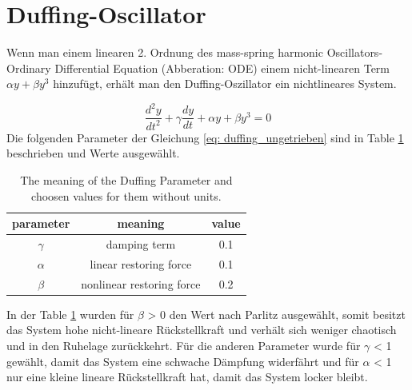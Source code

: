 \documentclass[oneside,10pt,a4paper]{report}
\begin{document}
		\section{Duffing-Oscillator}
		Wenn man einem linearen 2. Ordnung des mass-spring harmonic Oscillators-Ordinary Differential Equation (Abberation: ODE) einem nicht-linearen Term $\alpha y +\beta y^3$ hinzufügt, erhält man den Duffing-Oszillator\cite{twist_paper} ein nichtlineares System.
		
		\begin{equation}\label{eq: duffing_ungetrieben}
			\frac{d^2y}{dt^2} + \gamma \frac{dy}{dt} + \alpha y + \beta y^3 = 0
		\end{equation}
		Die folgenden Parameter der Gleichung \ref{eq: duffing_ungetrieben} sind in Table \ref{tab: duffing_ungetriebene_parameter} beschrieben und Werte ausgewählt. 
		
			\begin{table}[H]
			\centering
			\caption{The meaning of the Duffing Parameter and choosen values for them without units.}
			\label{tab: duffing_ungetriebene_parameter}
			\begin{tabular}{c c c}
				\toprule
				parameter & meaning & value\\
				\midrule
				$\gamma$ & damping term & 0.1\\
				$\alpha$ & linear restoring force & 0.1\\
				$\beta$& nonlinear restoring force & 0.2\cite{Parlitz_p93}\\
				\bottomrule
			\end{tabular}
		\end{table}
		
		In der Table \ref{tab: duffing_ungetriebene_parameter} wurden für $\beta$ > 0 den Wert nach Parlitz ausgewählt, somit besitzt das System hohe nicht-lineare Rückstellkraft und verhält sich weniger chaotisch und in den Ruhelage zurückkehrt. Für die anderen Parameter wurde für $\gamma$ < 1 gewählt, damit das System eine schwache Dämpfung widerfährt und für $\alpha$ < 1 nur eine kleine lineare Rückstellkraft hat, damit das System locker bleibt.
		
\end{document}
